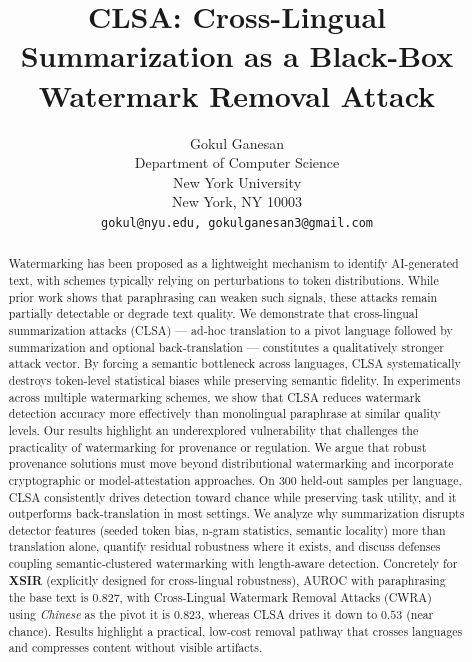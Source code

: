 \documentclass{article}
\title{CLSA: Cross-Lingual Summarization as a Black-Box Watermark Removal Attack}
\author{Gokul Ganesan \\
  Department of Computer Science\\
  New York University\\
  New York, NY 10003 \\
  \texttt{gokul@nyu.edu, gokulganesan3@gmail.com} \\
}
\begin{document}
\maketitle


\begin{abstract}
Watermarking has been proposed as a lightweight mechanism to identify AI-generated text, with schemes typically relying on perturbations to token distributions. While prior work shows that paraphrasing can weaken such signals, these attacks remain partially detectable or degrade text quality. We demonstrate that cross-lingual summarization attacks (CLSA) — ad-hoc translation to a pivot language followed by summarization and optional back-translation — constitutes a qualitatively stronger attack vector. By forcing a semantic bottleneck across languages, CLSA systematically destroys token-level statistical biases while preserving semantic fidelity. In experiments across multiple watermarking schemes, we show that CLSA reduces watermark detection accuracy more effectively than monolingual paraphrase at similar quality levels. Our results highlight an underexplored vulnerability that challenges the practicality of watermarking for provenance or regulation. We argue that robust provenance solutions must move beyond distributional watermarking and incorporate cryptographic or model-attestation approaches. On 300 held‑out samples per language, CLSA consistently drives detection toward chance while preserving task utility, and it outperforms back‑translation in most settings. We analyze why summarization disrupts detector features (seeded token bias, n‑gram statistics, semantic locality) more than translation alone, quantify residual robustness where it exists, and discuss defenses coupling semantic‑clustered watermarking with length‑aware detection. Concretely for \textbf{XSIR} (explicitly designed for cross-lingual robustness), AUROC with paraphrasing the base text is $0.827$, with Cross-Lingual Watermark Removal Attacks (CWRA)~\citep{He2024cwra} using \emph{Chinese} as the pivot it is $0.823$, whereas CLSA drives it down to $0.53$ (near chance). Results highlight a practical, low‑cost removal pathway that crosses languages and compresses content without visible artifacts.
\end{abstract}
\end{document}
